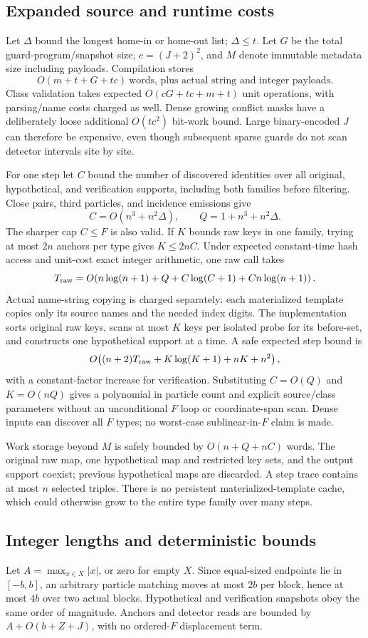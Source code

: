 \documentclass[11pt,a4paper]{article}
\numberwithin{equation}{section}
\begin{document}
\subsection{Expanded source and runtime costs}
Let $\Delta$ bound the longest home-in or home-out list; $\Delta\le t$. Let $G$ be the total guard-program/snapshot size, $c=(J+2)^2$, and $M$ denote immutable metadata size including payloads. Compilation stores
\[
O(m+t+G+tc)\ \text{words, plus actual string and integer payloads}.
\]
Class validation takes expected $O(cG+tc+m+t)$ unit operations, with parsing/name costs charged as well. Dense growing conflict masks have a deliberately loose additional $O(tc^2)$ bit-work bound. Large binary-encoded $J$ can therefore be expensive, even though subsequent sparse guards do not scan detector intervals site by site.

For one step let $C$ bound the number of discovered identities over all original, hypothetical, and verification supports, including both families before filtering. Close pairs, third particles, and incidence emissions give
\[
C=O(n^3+n^2\Delta),\qquad Q=1+n^3+n^2\Delta.
\]
The sharper cap $C\le F$ is also valid. If $K$ bounds raw keys in one family, trying at most $2n$ anchors per type gives $K\le2nC$. Under expected constant-time hash access and unit-cost exact integer arithmetic, one raw call takes
\[
T_{\rm raw}=O\!\left(n\log(n+1)+Q+C\log(C+1)+Cn\log(n+1)\right).
\]
Actual name-string copying is charged separately: each materialized template copies only its source names and the needed index digits. The implementation sorts original raw keys, scans at most $K$ keys per isolated probe for its before-set, and constructs one hypothetical support at a time. A safe expected step bound is
\[
O\!\left((n+2)T_{\rm raw}+K\log(K+1)+nK+n^2\right),
\]
with a constant-factor increase for verification. Substituting $C=O(Q)$ and $K=O(nQ)$ gives a polynomial in particle count and explicit source/class parameters without an unconditional $F$ loop or coordinate-span scan. Dense inputs can discover all $F$ types; no worst-case sublinear-in-$F$ claim is made.

Work storage beyond $M$ is safely bounded by $O(n+Q+nC)$ words. The original raw map, one hypothetical map and restricted key sets, and the output support coexist; previous hypothetical maps are discarded. A step trace contains at most $n$ selected triples. There is no persistent materialized-template cache, which could otherwise grow to the entire type family over many steps.

\subsection{Integer lengths and deterministic bounds}
Let $A=\max_{x\in X}|x|$, or zero for empty $X$. Since equal-sized endpoints lie in $[-b,b]$, an arbitrary particle matching moves at most $2b$ per block, hence at most $4b$ over two actual blocks. Hypothetical and verification snapshots obey the same order of magnitude. Anchors and detector reads are bounded by $A+O(b+Z+J)$, with no ordered-$F$ displacement term.
\end{document}
